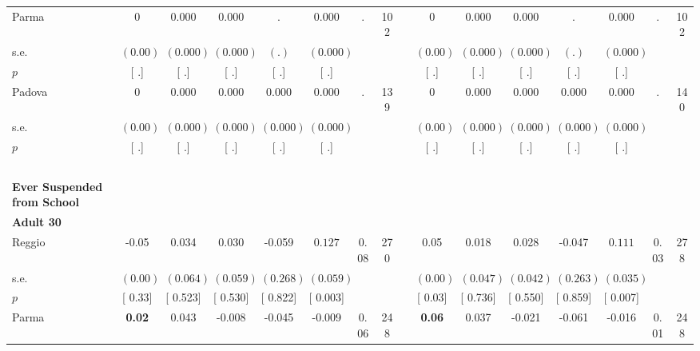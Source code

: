 \begin{longtable}{L{8em} c c c c c c c p{1em} c c c c c c c}
\quad \quad \quad Parma& 0 &     0.000 &     0.000 &         . &     0.000 &         . &       102 & & 0 &     0.000 &     0.000 &         . &     0.000 &         . &       102  \\*
\quad \quad \quad \quad s.e.& $ (     0.00)$ & $ (    0.000)$ & $ (    0.000)$ & $ (        .)$ & $ (    0.000)$ & & & & $ (     0.00)$ & $ (    0.000)$ & $ (    0.000)$ & $ (        .)$ & $ (    0.000)$ & &  \\*
\quad \quad \quad \quad $ p$ & [        .] & [        .] & [        .] & [        .] & [        .] & & & & [        .] & [        .] & [        .] & [        .] & [        .] & &  \\[1em]
\quad \quad \quad Padova& 0 &     0.000 &     0.000 &     0.000 &     0.000 &         . &       139 & & 0 &     0.000 &     0.000 &     0.000 &     0.000 &         . &       140  \\*
\quad \quad \quad \quad s.e.& $ (     0.00)$ & $ (    0.000)$ & $ (    0.000)$ & $ (    0.000)$ & $ (    0.000)$ & & & & $ (     0.00)$ & $ (    0.000)$ & $ (    0.000)$ & $ (    0.000)$ & $ (    0.000)$ & &  \\*
\quad \quad \quad \quad $ p$ & [        .] & [        .] & [        .] & [        .] & [        .] & & & & [        .] & [        .] & [        .] & [        .] & [        .] & &  \\[1em]
~\\[1em]
\textbf{Ever Suspended from School} \\*
\quad \quad \textbf{Adult 30} & & & & & & & & & & & & & & & \\* 
\quad \quad \quad Reggio& -0.05 &     0.034 &     0.030 &    -0.059 & $ \mathbf{    0.127}$ &      0.08 &       270 & & 0.05 &     0.018 &     0.028 &    -0.047 & $ \mathbf{    0.111}$ &      0.03 &       278  \\*
\quad \quad \quad \quad s.e.& $ (     0.00)$ & $ (    0.064)$ & $ (    0.059)$ & $ (    0.268)$ & $ (    0.059)$ & & & & $ (     0.00)$ & $ (    0.047)$ & $ (    0.042)$ & $ (    0.263)$ & $ (    0.035)$ & &  \\*
\quad \quad \quad \quad $ p$ & [     0.33] & [    0.523] & [    0.530] & [    0.822] & [    0.003] & & & & [     0.03] & [    0.736] & [    0.550] & [    0.859] & [    0.007] & &  \\[1em]
\quad \quad \quad Parma& \textbf{     0.02} &     0.043 &    -0.008 &    -0.045 &    -0.009 &      0.06 &       248 & & \textbf{     0.06} &     0.037 &    -0.021 &    -0.061 &    -0.016 &      0.01 &       248  \\*

\end{longtable}
